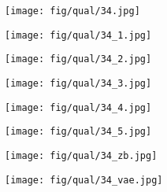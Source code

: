 \documentclass[10pt,twocolumn,letterpaper]{article}
\newcommand{\sze}{0.13}
\newcommand{\szle}{0.08}
\begin{document}
\begin{figure*}

\center

\begin{subfigure}[c]{\sze\linewidth}
\texttt{[image: fig/qual/34.jpg]}
\end{subfigure}
\begin{subfigure}[c]{\sze\linewidth}
\texttt{[image: fig/qual/34\_1.jpg]}
\end{subfigure}
\begin{subfigure}[c]{\sze\linewidth}
\texttt{[image: fig/qual/34\_2.jpg]}
\end{subfigure}
\begin{subfigure}[c]{\sze\linewidth}
\texttt{[image: fig/qual/34\_3.jpg]}
\end{subfigure}
\begin{subfigure}[c]{\sze\linewidth}
\texttt{[image: fig/qual/34\_4.jpg]}
\end{subfigure}
\hspace{3pt}
\begin{subfigure}[c]{\sze\linewidth}
\texttt{[image: fig/qual/34\_5.jpg]}
\end{subfigure}
\begin{subfigure}[c]{\szle\linewidth}
\texttt{[image: fig/qual/34\_zb.jpg]}
\end{subfigure}
\hspace{3pt}
\begin{subfigure}[c]{\szle\linewidth}
\texttt{[image: fig/qual/34\_vae.jpg]}
\end{subfigure}


\end{figure*}
\end{document}
